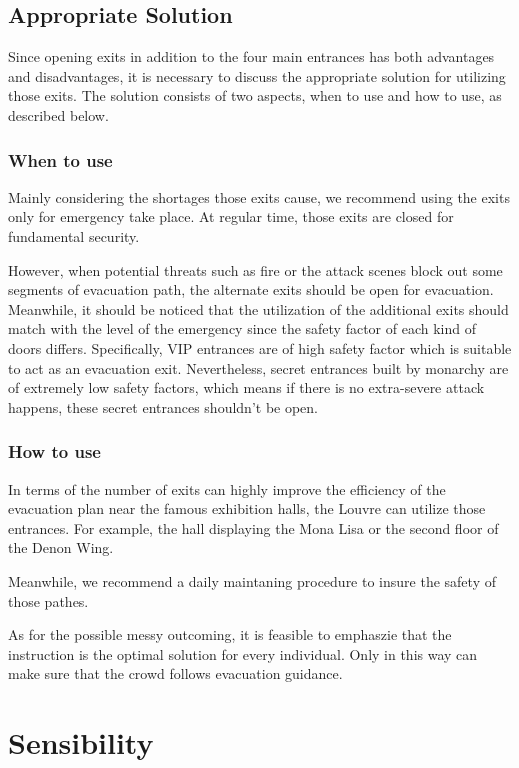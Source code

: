\documentclass{mcmthesis}
\begin{document}
\subsection{Appropriate Solution}

Since opening exits in addition to the four main entrances has both advantages and disadvantages, it is necessary to discuss the appropriate solution for utilizing those exits. The solution consists of two aspects, when to use and how to use, as described below.

\subsubsection{When to use}

Mainly considering the shortages those exits cause, we recommend using the exits only for emergency take place. At regular time, those exits are closed for fundamental security.

However, when potential threats such as fire or the attack scenes block out some segments of evacuation path, the alternate exits should be open for evacuation. Meanwhile, it should be noticed that the utilization of the additional exits should match with the level of the emergency since the safety factor of each kind of doors differs. Specifically, VIP entrances are of high safety factor which is suitable to act as an evacuation exit. Nevertheless, secret entrances built by monarchy are of extremely low safety factors, which means if there is no extra-severe attack happens, these secret entrances shouldn't be open.

\subsubsection{How to use}

In terms of the number of exits can highly improve the efficiency of the evacuation plan near the famous exhibition halls, the Louvre can utilize those entrances. For example, the hall displaying the Mona Lisa or the second floor of the Denon Wing.

Meanwhile, we recommend a daily maintaning procedure to insure the safety of those pathes.

As for the possible messy outcoming, it is feasible to emphaszie that the instruction is the optimal solution for every individual. Only in this way can make sure that the crowd follows evacuation guidance.

\section{Sensibility}
\end{document}
